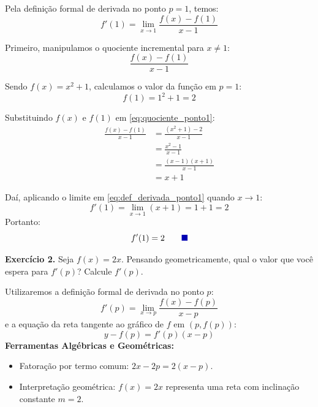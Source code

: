 \documentclass[12pt,a4paper]{article}
\newcommand{\qedsymbolmath}{\tag*{\textcolor{blue!70!black}{\rule{1.6ex}{1.6ex}}}}
\begin{document}
\begin{enumerate}
    Pela definição formal de derivada no ponto $p = 1$, temos:
    \begin{equation}
        f'(1) = \lim_{x \to 1} \frac{f(x) - f(1)}{x - 1} \label{eq:def_derivada_ponto1}
    \end{equation}

    Primeiro, manipulamos o quociente incremental para $x \neq 1$:
    \begin{equation}
        \frac{f(x) - f(1)}{x - 1} \label{eq:quociente_ponto1}
    \end{equation}

    Sendo $f(x) = x^2 + 1$, calculamos o valor da função em $p = 1$:
    \[
    f(1) = 1^2 + 1 = 2
    \]

    Substituindo $f(x)$ e $f(1)$ em \eqref{eq:quociente_ponto1}:
    \begin{align*}
        \frac{f(x) - f(1)}{x - 1} &= \frac{(x^2 + 1) - 2}{x - 1} \\[0.25cm]
        &= \frac{x^2 - 1}{x - 1} \\[0.25cm]
        &= \frac{(x - 1)(x + 1)}{x - 1} \\[0.25cm]
        &= x + 1
    \end{align*}

    Daí, aplicando o limite em \eqref{eq:def_derivada_ponto1} quando $x \to 1$:
    \[
    f'(1) = \lim_{x \to 1} (x + 1) = 1 + 1 = 2
    \]
    Portanto:
    \begin{equation}
        f'(1) = 2 \qedsymbolmath
    \end{equation}
\end{enumerate}

\vspace{0.5cm}
\noindent\textbf{Exercício 2.} Seja $f(x) = 2x$. Pensando geometricamente, qual o valor que você espera para $f'(p)$? Calcule $f'(p)$.
\setcounter{equation}{0}

\begin{recursosbox}[title=Recursos Utilizados]
Utilizaremos a definição formal de derivada no ponto $p$:
\[
f'(p) = \lim_{x \to p} \frac{f(x) - f(p)}{x - p}
\]
e a equação da reta tangente ao gráfico de $f$ em $(p, f(p))$:
\[
y - f(p) = f'(p)(x - p)
\]
\textbf{Ferramentas Algébricas e Geométricas:}
\begin{itemize}[noitemsep, topsep=2pt]
    \item Fatoração por termo comum: $2x - 2p = 2(x - p)$.
    \item Interpretação geométrica: $f(x) = 2x$ representa uma reta com inclinação constante $m = 2$.
\end{itemize}
\end{recursosbox}
\end{document}
